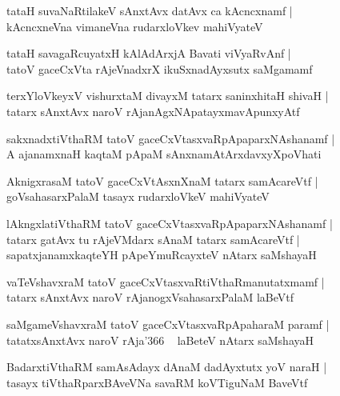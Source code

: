\documentclass[twoside,12pt,openright]{book}
\newcounter{shloka}[chapter]
\begin{document}
\begin{shloka}
tataH suvaNaRtilakeV sAnxtAvx datAvx ca kAcncxnamf |\\
kAcncxneVna vimaneVna rudarxloVkev mahiVyateV
\end{shloka}

\begin{shloka}
tataH savagaRcuyatxH kAlAdArxjA Bavati viVyaRvAnf |\\
tatoV gaceCxVta rAjeVnadxrX ikuSxnadAyxsutx saMgamamf 
\end{shloka}

\begin{shloka}
terxYloVkeyxV vishurxtaM divayxM tatarx saninxhitaH shivaH |\\
tatarx sAnxtAvx naroV rAjanAgxNApatayxmavApunxyAtf
\end{shloka}

\begin{shloka}
sakxnadxtiVthaRM tatoV gaceCxVtasxvaRpApaparxNAshanamf |\\
A ajanamxnaH kaqtaM pApaM sAnxnamAtArxdavxyXpoVhati
\end{shloka}

\begin{shloka}
AknigxrasaM tatoV gaceCxVtAsxnXnaM tatarx samAcareVtf |\\
goVsahasarxPalaM tasayx rudarxloVkeV mahiVyateV 
\end{shloka}

\begin{shloka}
lAkngxlatiVthaRM tatoV gaceCxVtasxvaRpApaparxNAshanamf |\\
tatarx gatAvx tu rAjeVMdarx sAnaM tatarx samAcareVtf |\\
sapatxjanamxkaqteYH pApeYmuRcayxteV nAtarx saMshayaH 
\end{shloka}

\begin{shloka}
vaTeVshavxraM tatoV gaceCxVtasxvaRtiVthaRmanutatxmamf |\\
tatarx sAnxtAvx naroV rAjanogxVsahasarxPalaM laBeVtf 
\end{shloka}


\begin{shloka}
saMgameVshavxraM tatoV gaceCxVtasxvaRpApaharaM paramf |\\
tatatxsAnxtAvx naroV rAja\char'366 ~ laBeteV  nAtarx saMshayaH 
\end{shloka}

\begin{shloka}
BadarxtiVthaRM samAsAdayx dAnaM dadAyxtutx yoV naraH |\\
tasayx tiVthaRparxBAveVNa savaRM koVTiguNaM BaveVtf
\end{shloka}
\end{document}
